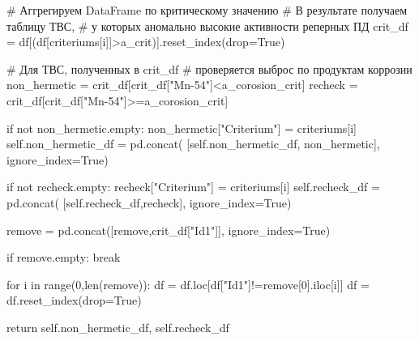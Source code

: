 \documentclass[a4paper,12pt]{article}
\begin{document}
\begin{appendices}
\begin{flushleft}
\begin{MyCodes}
			# Аггрегируем DataFrame по критическому значению
			# В результате получаем таблицу ТВС, 
			# у которых аномально высокие активности реперных ПД
			crit_df = df[(df[criteriums[i]]>a_crit)].reset_index(drop=True)
			
			# Для ТВС, полученных в crit_df
			# проверяется выброс по продуктам коррозии
			non_hermetic = crit_df[crit_df["Mn-54"]<a_corosion_crit]
			recheck = crit_df[crit_df["Mn-54"]>=a_corosion_crit]
			
			if not non_hermetic.empty:
				non_hermetic["Criterium"] = criteriums[i] 
				self.non_hermetic_df = pd.concat(
					[self.non_hermetic_df,
						non_hermetic], ignore_index=True)
			
			if not recheck.empty:
				recheck["Criterium"] = criteriums[i] 
				self.recheck_df = pd.concat(
					[self.recheck_df,recheck], 
						ignore_index=True)
			
			remove = pd.concat([remove,crit_df["Id1"]], ignore_index=True)
		
		if remove.empty:
			break
		
		for i in range(0,len(remove)):
		df = df.loc[df["Id1"]!=remove[0].iloc[i]]
		df = df.reset_index(drop=True)
	
	return self.non_hermetic_df, self.recheck_df
\end{MyCodes}
\end{flushleft}

\pagebreak



\end{appendices}
\end{document}
